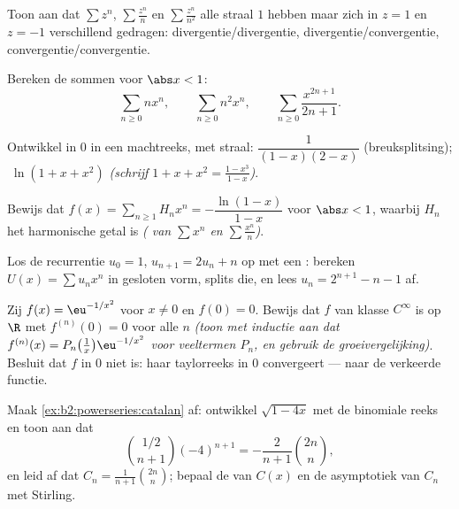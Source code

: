 \begin{exercise}[$\star$]\label{exo:b2:powerseries:2}
Toon aan dat $\sum z^n$, $\sum \frac{z^n}{n}$ en $\sum
\frac{z^n}{n^2}$ alle straal $1$ hebben maar zich in $z = 1$ en $z
= -1$ verschillend gedragen: divergentie/divergentie,
divergentie/convergentie, convergentie/convergentie.
\end{exercise}

\begin{exercise}[$\star$]\label{exo:b2:powerseries:3}
Bereken de sommen voor $\abs x < 1$:
\[
\sum_{n\geq0} n x^n,
\qquad
\sum_{n\geq0} n^2 x^n,
\qquad
\sum_{n\geq0} \frac{x^{2n+1}}{2n+1} .
\]
\end{exercise}

\begin{exercise}[$\star\star$]\label{exo:b2:powerseries:4}
Ontwikkel in $0$ in een machtreeks, met straal:
$\dfrac{1}{(1-x)(2-x)}$ (breuksplitsing); $\;\ln(1 + x + x^2)$
\emph{(schrijf $1 + x + x^2 = \frac{1 - x^3}{1 - x}$)}.
\end{exercise}

\begin{exercise}[$\star\star$]\label{exo:b2:powerseries:5}
Bewijs dat $f(x) = \sum_{n\geq1} H_n x^n = -\dfrac{\ln(1 - x)}{1 -
x}$ voor $\abs x < 1$, waarbij $H_n$ het harmonische getal is
\emph{( van $\sum x^n$ en $\sum \frac{x^n}{n}$)}.
\end{exercise}

\begin{exercise}[$\star\star$]\label{exo:b2:powerseries:6}
Los de recurrentie $u_0 = 1$, $u_{n+1} = 2u_n + n$ op met een
: bereken $U(x) = \sum u_nx^n$ in gesloten vorm,
splits die, en lees $u_n = 2^{n+1} - n - 1$ af.
\end{exercise}

\begin{exercise}[$\star\star$]\label{exo:b2:powerseries:7}
Zij $f(x) = \eu^{-1/x^2}$ voor $x \neq 0$ en $f(0) = 0$. Bewijs dat
$f$ van klasse $C^\infty$ is op $\R$ met $f^{(n)}(0) = 0$ voor alle
$n$ \emph{(toon met inductie aan dat $f^{(n)}(x) =
P_n\bigl(\frac1x\bigr) \eu^{-1/x^2}$ voor veeltermen $P_n$, en
gebruik de groeivergelijking)}. Besluit dat $f$ in $0$ niet
 is: haar taylorreeks in $0$ convergeert --- naar de
verkeerde functie.
\end{exercise}

\begin{exercise}[$\star\star\star$]\label{exo:b2:powerseries:8}
Maak \cref{ex:b2:powerseries:catalan} af: ontwikkel $\sqrt{1 - 4x}$
met de binomiale reeks en toon aan dat
\[
\binom{1/2}{n+1}(-4)^{n+1} = -\frac{2}{n+1}\binom{2n}{n},
\]
en leid af dat $C_n = \frac{1}{n+1}\binom{2n}{n}$; bepaal de
 van $C(x)$ en de asymptotiek van $C_n$ met
Stirling.
\end{exercise}

